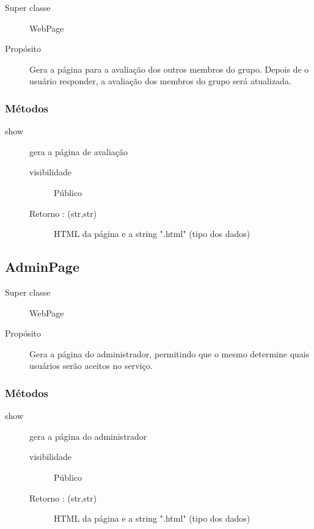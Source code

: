 \documentclass[a4paper]{article}
\begin{document}
	\begin{description}
		\item [Super classe] WebPage
		\item [Propósito] Gera a página para a avaliação dos outros membros do grupo. Depois de o usuário responder, a avaliação dos membros do grupo será atualizada.
	\end{description}
	
	\subsubsection{Métodos}
		\begin{description} %
		 \item [show] gera a página de avaliação
			\begin{description} %
				\item [visibilidade] Público			 
				\item [Retorno : (str,str)] HTML da página e a string ".html" (tipo dos dados)
			\end{description} %
		\end{description} %
	
	\subsection{AdminPage}
	
	\begin{description}
		\item [Super classe] WebPage
		\item [Propósito] Gera a página do administrador, permitindo que o mesmo determine quais usuários serão aceitos no serviço.
	\end{description}
	
	\subsubsection{Métodos}
		\begin{description} %
		 \item [show] gera a página do administrador
			\begin{description} %
				\item [visibilidade] Público			 
				\item [Retorno : (str,str)] HTML da página e a string ".html" (tipo dos dados)
			\end{description} %
		\end{description} %
	
\end{document}
